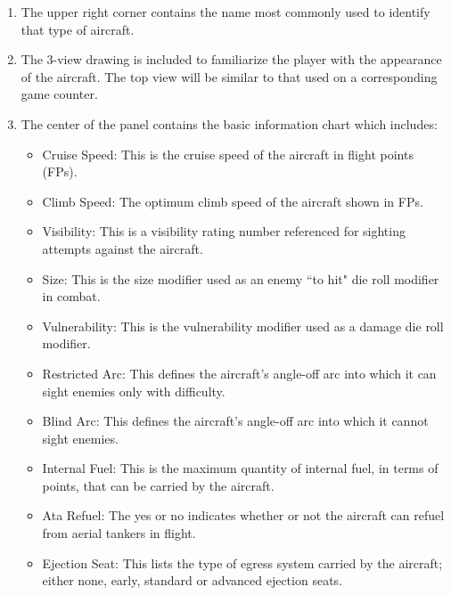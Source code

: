 \begin{enumerate}

    \item {} 
    The upper right corner contains the name most commonly used to identify that type of aircraft. 

    \item {} 
    The 3-view drawing is included to familiarize the player with the appearance of the aircraft. The top view will be similar to that used on a corresponding game counter.


    \item {} 
    The center of the panel contains the basic information chart which includes:
    \begin{itemize}
        \item Cruise Speed: This is the cruise speed of the aircraft in flight points (FPs).
        \item Climb Speed: The optimum climb speed of the aircraft shown in FPs.
        \item Visibility: This is a visibility rating number referenced for sighting attempts against the aircraft.
        \item Size: This is the size modifier used as an enemy “to hit" die roll modifier in combat.
        \item Vulnerability: This is the vulnerability modifier used as a damage die roll modifier.
        \item Restricted Arc: This defines the aircraft's angle-off arc into which it can sight enemies only with difficulty.
        \item Blind Arc: This defines the aircraft's angle-off arc into which it cannot sight enemies.
        \item Internal Fuel: This is the maximum quantity of internal fuel, in terms of points, that can be carried by the aircraft.
        \item Ata Refuel: The yes or no indicates whether or not the aircraft can refuel from aerial tankers in flight.
        \item Ejection Seat: This lists the type of egress system carried by the aircraft; either none, early, standard or advanced ejection seats.
    \end{itemize}


\end{enumerate}
